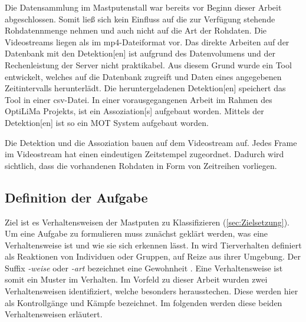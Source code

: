 Die Datensammlung im Mastputenstall war bereits vor Beginn dieser Arbeit abgeschlossen. Somit ließ sich kein Einfluss auf die zur Verfügung stehende Rohdatennmenge nehmen und auch nicht auf die Art der Rohdaten. Die Videostreams liegen als im mp4-Dateiformat vor. Das direkte Arbeiten auf der Datenbank mit den \gls{Detektion}[en] ist aufgrund des Datenvolumens und der Rechenleistung der Server nicht praktikabel. Aus diesem Grund wurde ein Tool entwickelt, welches auf die Datenbank zugreift und Daten eines angegebenen Zeitintervalls herunterlädt. Die heruntergeladenen \gls{Detektion}[en] speichert das Tool in einer csv-Datei. In einer vorausgegangenen Arbeit im Rahmen des \acrshort{OptiLiMa} Projekts, ist ein \gls{Assoziation}[s] aufgebaut worden. Mittels der \gls{Detektion}[en] ist so ein \gls{MOT} System aufgebaut worden. \par

Die \gls{Detektion} und die \gls{Assoziation} bauen auf dem Videostream auf. Jedes \gls{Frame} im Videostream hat einen eindeutigen Zeitstempel zugeordnet. Dadurch wird sichtlich, dass die vorhandenen Rohdaten in Form von Zeitreihen vorliegen.

\subsection{Definition der Aufgabe} \label{sec:Meth DefAufgabe}
Ziel ist es Verhaltensweisen der Mastputen zu Klassifizieren (\autoref{sec:Zielsetzung}). Um eine Aufgabe zu formulieren muss zunächst geklärt werden, was eine Verhaltensweise ist und wie sie sich erkennen lässt. In \cite{Levitis.2009} wird Tierverhalten definiert als Reaktionen von Individuen oder Gruppen, auf Reize aus ihrer Umgebung. Der Suffix \textit{-weise} oder \textit{-art} bezeichnet eine Gewohnheit \cite{duden.art}. Eine Verhaltensweise ist somit ein Muster im Verhalten. Im Vorfeld zu dieser Arbeit wurden zwei Verhaltensweisen identifiziert, welche besonders herausstechen. Diese werden hier als Kontrollgänge und Kämpfe bezeichnet. Im folgenden werden diese beiden Verhaltensweisen erläutert. \dubpar

